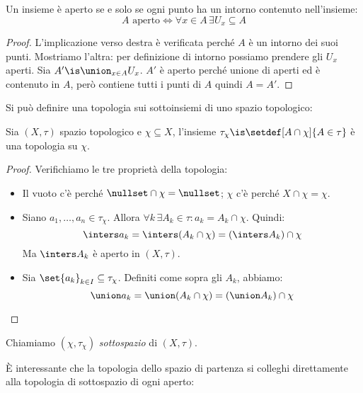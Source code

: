 

\begin{lemma}\label{th:apertointorni}
	Un insieme è aperto se e solo se ogni punto ha un intorno contenuto nell'insieme:
	\[A\text{ aperto}\iff
	\forall x\in A\,\exists U_x\subseteq A\]
\end{lemma}

\begin{proof}
	L'implicazione verso destra è verificata perché $A$ è un intorno dei suoi punti.
	Mostriamo l'altra: per definizione di intorno possiamo prendere gli $U_x$ aperti. Sia $A'\is\union_{x\in A}U_x$. $A'$ è aperto perché unione di aperti ed è contenuto in $A$, però contiene tutti i punti di $A$ quindi $A=A'$.
\end{proof}


Si può definire una topologia sui sottoinsiemi di uno spazio topologico:

\begin{prop}
	Sia $(X,\tau)$ spazio topologico e $\chi\subseteq X$, l'insieme
	$\tau_\chi\is\setdef[A\cap\chi]{A\in\tau}$
	è una topologia su $\chi$.
\end{prop}

\begin{proof}
	Verifichiamo le tre proprietà della topologia:
	\begin{itemize}
		\item Il vuoto c'è perché $\nullset\cap\chi=\nullset$;
		$\chi$ c'è perché $X\cap\chi=\chi$.
		\item Siano $a_1,\ldots,a_n\in\tau_\chi$.
		Allora $\forall k\,\exists A_k\in\tau:a_k=A_k\cap\chi$.
		Quindi:
		\[\inters a_k=\inters(A_k\cap\chi)=\left(\inters A_k\right)\cap\chi\]
		Ma $\inters A_k$ è aperto in $(X,\tau)$.
		\item Sia $\set{a_k}_{k\in I}\subseteq\tau_\chi$.
		Definiti come sopra gli $A_k$, abbiamo:
		\[\union a_k=\union(A_k\cap\chi)=\left(\union A_k\right)\cap\chi \qedhere\]
	\end{itemize}
\end{proof}

\begin{defn}[Sottospazio]
	Chiamiamo $(\chi,\tau_\chi)$ \emph{sottospazio} di $(X,\tau)$.
\end{defn}

È interessante che la topologia dello spazio di partenza si colleghi direttamente alla topologia di sottospazio di ogni aperto:


